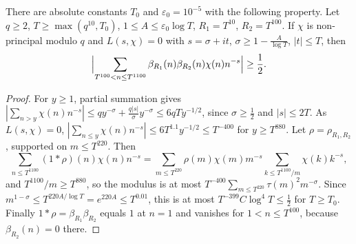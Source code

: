 \begin{lemma}\label{lem:detector}
There are absolute constants $T_0$ and $\varepsilon_0=10^{-5}$ with the following property. Let $q\ge2$, $T\ge\max(q^{10},T_0)$, $1\le A\le\varepsilon_0\log T$, $R_1=T^{10}$, $R_2=T^{100}$. If $\chi$ is non-principal modulo $q$ and $L(s,\chi)=0$ with $s=\sigma+it$, $\sigma\ge1-\frac A{\log T}$, $|t|\le T$, then
\[
\Bigl|\sum_{T^{100}<n\le T^{1100}}\beta_{R_1}(n)\beta_{R_2}(n)\chi(n)n^{-s}\Bigr|\ge\frac12.
\]
\end{lemma}
\begin{proof}
For $y\ge1$, partial summation gives $|\sum_{n>y}\chi(n)n^{-s}|\le qy^{-\sigma}+\frac{q|s|}\sigma y^{-\sigma}\le6qTy^{-1/2}$, since $\sigma\ge\frac12$ and $|s|\le2T$. As $L(s,\chi)=0$, $|\sum_{n\le y}\chi(n)n^{-s}|\le6T^{1.1}y^{-1/2}\le T^{-400}$ for $y\ge T^{880}$. Let $\rho=\rho_{R_1,R_2}$, supported on $m\le T^{220}$. Then
\[
\sum_{n\le T^{1100}}(1*\rho)(n)\chi(n)n^{-s}=\sum_{m\le T^{220}}\rho(m)\chi(m)m^{-s}\sum_{k\le T^{1100}/m}\chi(k)k^{-s},
\]
and $T^{1100}/m\ge T^{880}$, so the modulus is at most $T^{-400}\sum_{m\le T^{220}}\tau(m)^2m^{-\sigma}$. Since $m^{1-\sigma}\le T^{220A/\log T}=e^{220A}\le T^{0.01}$, this is at most $T^{-399}C\log^4T\le\frac12$ for $T\ge T_0$. Finally $1*\rho=\beta_{R_1}\beta_{R_2}$ equals $1$ at $n=1$ and vanishes for $1<n\le T^{100}$, because $\beta_{R_2}(n)=0$ there.
\end{proof}

